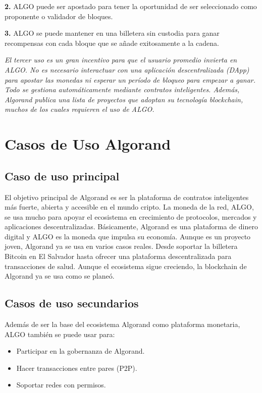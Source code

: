 \documentclass{article}
\begin{document}
\textbf{2. }ALGO puede ser apostado para tener la oportunidad de ser seleccionado como proponente o validador de bloques.

\textbf{3. }ALGO se puede mantener en una billetera sin custodia para ganar recompensas con cada bloque que se añade exitosamente a la cadena.

\textit{El tercer uso es un gran incentivo para que el usuario promedio invierta en ALGO. No es necesario interactuar con una aplicación descentralizada (DApp) para apostar las monedas ni esperar un período de bloqueo para empezar a ganar. Todo se gestiona automáticamente mediante contratos inteligentes. Además, Algorand publica una lista de proyectos que adoptan su tecnología blockchain, muchos de los cuales requieren el uso de ALGO.}


\section{Casos de Uso Algorand}

\subsection{Caso de uso principal}

El objetivo principal de Algorand es ser la plataforma de contratos inteligentes más fuerte, abierta y accesible en el mundo cripto. La moneda de la red, ALGO, se usa mucho para apoyar el ecosistema en crecimiento de protocolos, mercados y aplicaciones descentralizadas. Básicamente, Algorand es una plataforma de dinero digital y ALGO es la moneda que impulsa su economía.
Aunque es un proyecto joven, Algorand ya se usa en varios casos reales. Desde soportar la billetera Bitcoin en El Salvador hasta ofrecer una plataforma descentralizada para transacciones de salud. Aunque el ecosistema sigue creciendo, la blockchain de Algorand ya se usa como se planeó.

\subsection{Casos de uso secundarios}

Además de ser la base del ecosistema Algorand como plataforma monetaria, ALGO también se puede usar para:

\begin{itemize}
    \item Participar en la gobernanza de Algorand.
\end{itemize}
\begin{itemize}
    \item Hacer transacciones entre pares (P2P).
\end{itemize}
\begin{itemize}
    \item Soportar redes con permisos.
\end{itemize}
\end{document}
